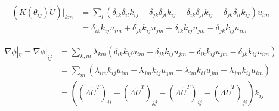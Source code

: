\documentclass[11pt,a4paper]{article}  %
\begin{document}
\begin{equation}
\begin{aligned}
\left( K(\theta_{ij}) \tilde{U} \right)|_{km} &= \sum_l \left( \delta_{ik} \delta_{il} k_{ij} + \delta_{jk} \delta_{jl} k_{ij} - \delta_{ik} \delta_{jl} k_{ij} - \delta_{jk} \delta_{il} k_{ij} \right) u_{lm}\\
&= \delta_{ik} k_{ij} u_{im} + \delta_{jk} k_{ij} u_{jm} - \delta_{ik} k_{ij} u_{jm} - \delta_{jk} k_{ij} u_{im}
\end{aligned}
\end{equation}

\begin{equation}
\begin{aligned}
\nabla\phi|_\eta = \nabla\phi|_{ij} &= \sum_{k,m} \lambda_{km} \left( \delta_{ik} k_{ij} u_{im} + \delta_{jk} k_{ij} u_{jm} - \delta_{ik} k_{ij} u_{jm} - \delta_{jk} k_{ij} u_{im} \right)\\
&= \sum_m \left( \lambda_{im} k_{ij} u_{im} + \lambda_{jm} k_{ij} u_{jm} - \lambda_{im} k_{ij} u_{jm} - \lambda_{jm} k_{ij} u_{im} \right)\\
&= \left( ( \Lambda\tilde{U}^T )_{ii} + ( \Lambda\tilde{U}^T )_{jj} - ( \Lambda\tilde{U}^T )_{ij} - ( \Lambda\tilde{U}^T )_{ji} \right) k_{ij}
\end{aligned}
\end{equation}
\end{document}
